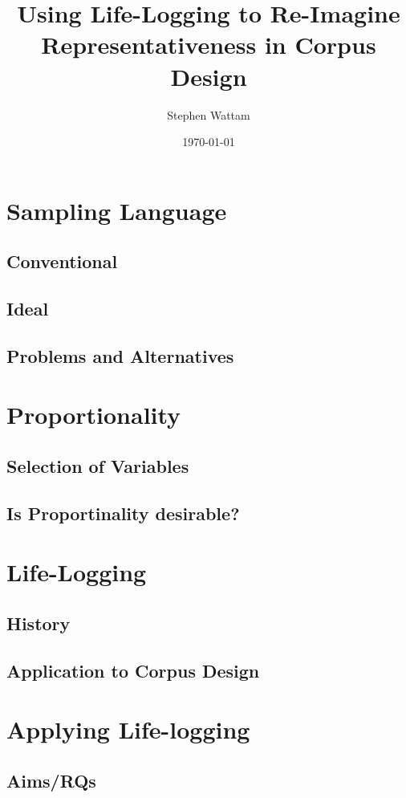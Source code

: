 \documentclass[xcolor=x11names,compress]{beamer}
\title{Using Life-Logging to Re-Imagine Representativeness in Corpus Design}
\author{Stephen Wattam}
\institute[2013]{Lancaster University}
\date{\tiny \today}
\begin{document}
\maketitle

\frame{\tableofcontents}

\section{Sampling Language}
\subsection{Conventional}
\subsection{Ideal}
\subsection{Problems and Alternatives}

\section{Proportionality}
\subsection{Selection of Variables}
\subsection{Is Proportinality desirable?}


\section{Life-Logging}
\subsection{History}
\subsection{Application to Corpus Design}

\section{Applying Life-logging}
\subsection{Aims/RQs}
\end{document}
